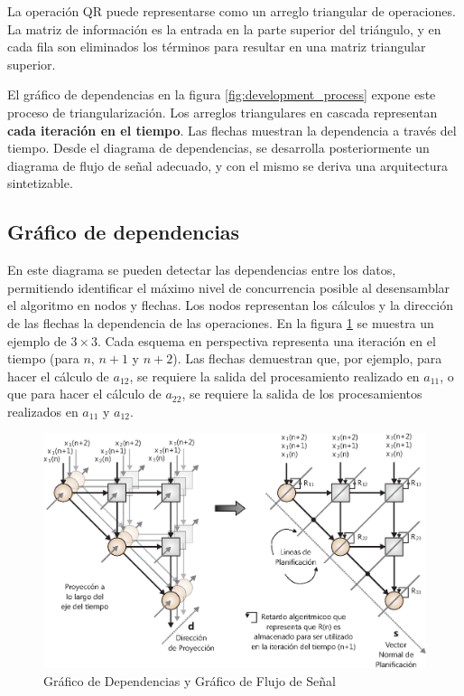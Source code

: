 La operación QR puede representarse como un arreglo triangular de operaciones. La matriz de información es la entrada en la parte superior del triángulo, y en cada fila son eliminados los términos para resultar en una matriz triangular superior.

El gráfico de dependencias en la figura \ref{fig:development_process} expone este proceso de triangularización. Los arreglos triangulares en cascada representan \textbf{cada iteración en el tiempo}. Las flechas muestran la dependencia a través del tiempo. Desde el diagrama de dependencias, se desarrolla posteriormente un diagrama de flujo de señal adecuado, y con el mismo se deriva una arquitectura sintetizable.

\subsection{Gráfico de dependencias}

En este diagrama se pueden detectar las dependencias entre los datos, permitiendo identificar el máximo nivel de concurrencia posible al desensamblar el algoritmo en nodos y flechas. Los nodos representan los cálculos y la dirección de las flechas la dependencia de las operaciones. En la figura \ref{fig:dependence_vs_signal} se muestra un ejemplo de $3 \times 3$. Cada esquema en perspectiva representa una iteración en el tiempo (para $n$, $n+1$ y $n+2$). Las flechas demuestran que, por ejemplo, para hacer el cálculo de $a_{12}$, se requiere la salida del procesamiento realizado en $a_{11}$, o que para hacer el cálculo de $a_{22}$, se requiere la salida de los procesamientos realizados en $a_{11}$ y $a_{12}$.

\begin{figure}[h!]
        \centering
        \includegraphics[width=12cm]{./figures/C03-dependence_vs_signal}
        \caption{Gráfico de Dependencias y Gráfico de Flujo de Señal}
        \label{fig:dependence_vs_signal}
\end{figure}

